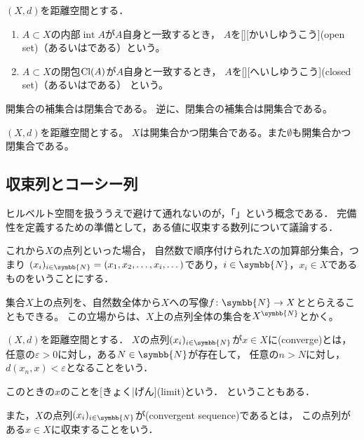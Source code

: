 \documentclass[../sotsu.tex]{subfiles}
\begin{document}
\begin{definition}[開集合と閉集合]
    \label{dfn:open-set-and-closed-set}
    \label{dfn:open-set}
    \label{dfn:closed-set}
    $(X, d)$を距離空間とする．
    \begin{enumerate}
        \item 
            $A \subset X$の内部$\operatorname{int} A$が$A$自身と一致するとき，
            $A$を[][かいしゆうこう](open set)（あるいはである）という。
        \item 
            $A \subset X$の閉包$\mathrm{Cl}(A)$が$A$自身と一致するとき，
            $A$を[][へいしゆうこう](closed set)（あるいはである） という。
    \end{enumerate}
\end{definition}

開集合の補集合は閉集合である。
逆に、閉集合の補集合は開集合である。


\begin{example}
    $(X, d)$を距離空間とする。
    $X$は開集合かつ閉集合である。また$\emptyset$も開集合かつ閉集合である。
\end{example}



\subsection{収束列とコーシー列}

ヒルベルト空間を扱ううえで避けて通れないのが，「」という概念である．
完備性を定義するための準備として，ある値に収束する数列について議論する．

これから$X$の点列といった場合，
自然数で順序付けられた$X$の加算部分集合，つまり
$\sequ{x_i}[i \in \symbb{N}] = (x_1, x_2, \dots, x_i, \dotsc)$であり，$i \in \symbb{N}$，$x_i \in X$であるものをいうことにする．

集合$X$上の点列を、自然数全体から$X$への写像$f \colon \symbb{N} \to X$ととらえることもできる。
この立場からは、$X$上の点列全体の集合を$X^{\symbb{N}}$とかく。

\begin{definition}[収束列]
    \label{dfn:convergent-sequence}
    $(X, d)$を距離空間とする．
    $X$の点列$\sequ{x_i}[i \in \symbb{N}]$が$x \in X$に(converge)とは，
    任意の$\varepsilon > 0$に対し，ある$N \in \symbb{N}$が存在して，
    任意の$n > N$に対し，$d(x_n, x) < \varepsilon$となることをいう．
    
    このときの$x$のことを[きょく|げん](limit)という\cite{uchida-set-2020}．
    ということもある．

    また，$X$の点列$\sequ{x_i}[i \in \symbb{N}]$が(convergent sequence)であるとは，
    この点列がある$x \in X$に収束することをいう．
\end{definition}
\end{document}
